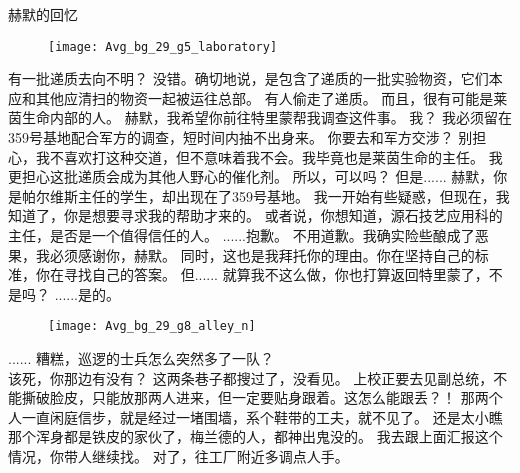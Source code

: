 \documentclass[openany]{book}
\begin{document}
\begin{center}赫默的回忆\end{center}
\begin{figure}[h]
    \centering
    \texttt{[image: Avg\_bg\_29\_g5\_laboratory]}
\end{figure}
\begin{dialogue}
     有一批递质去向不明？
     没错。确切地说，是包含了递质的一批实验物资，它们本应和其他应清扫的物资一起被运往总部。
     有人偷走了递质。
     而且，很有可能是莱茵生命内部的人。
     赫默，我希望你前往特里蒙帮我调查这件事。
     我？
     我必须留在359号基地配合军方的调查，短时间内抽不出身来。
     你要去和军方交涉？
     别担心，我不喜欢打这种交道，但不意味着我不会。我毕竟也是莱茵生命的主任。
     我更担心这批递质会成为其他人野心的催化剂。
     所以，可以吗？
     但是......
     赫默，你是帕尔维斯主任的学生，却出现在了359号基地。
     我一开始有些疑惑，但现在，我知道了，你是想要寻求我的帮助才来的。
     或者说，你想知道，源石技艺应用科的主任，是否是一个值得信任的人。
     ......抱歉。
     不用道歉。我确实险些酿成了恶果，我必须感谢你，赫默。
     同时，这也是我拜托你的理由。你在坚持自己的标准，你在寻找自己的答案。
     但......
     就算我不这么做，你也打算返回特里蒙了，不是吗？
     ......是的。
\end{dialogue}
\par

\begin{figure}[h]
    \centering
    \texttt{[image: Avg\_bg\_29\_g8\_alley\_n]}
\end{figure}
\begin{dialogue}
     ......
     糟糕，巡逻的士兵怎么突然多了一队？
    \\
     该死，你那边有没有？
     这两条巷子都搜过了，没看见。
     上校正要去见副总统，不能撕破脸皮，只能放那两人进来，但一定要贴身跟着。这怎么能跟丢？！
     那两个人一直闲庭信步，就是经过一堵围墙，系个鞋带的工夫，就不见了。
     还是太小瞧那个浑身都是铁皮的家伙了，梅兰德的人，都神出鬼没的。
     我去跟上面汇报这个情况，你带人继续找。
     对了，往工厂附近多调点人手。
\end{dialogue}
\end{document}
